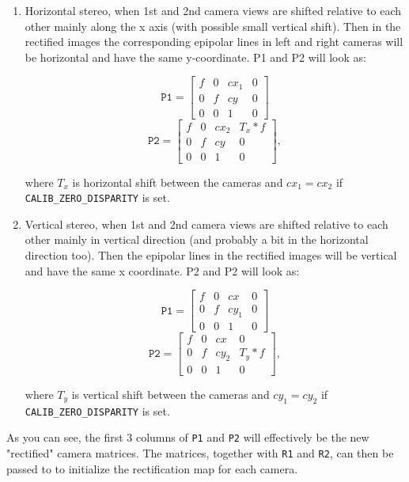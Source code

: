 \begin{enumerate}
\item Horizontal stereo, when 1st and 2nd camera views are shifted relative to each other mainly along the x axis (with possible small vertical shift). Then in the rectified images the corresponding epipolar lines in left and right cameras will be horizontal and have the same y-coordinate. P1 and P2 will look as: 

\[\texttt{P1}=
\begin{bmatrix}
f & 0 & cx_1 & 0\\
0 & f & cy & 0\\
0 & 0 & 1 & 0
\end{bmatrix}
\]
\[\texttt{P2}=
\begin{bmatrix}
f & 0 & cx_2 & T_x*f\\
0 & f & cy & 0\\
0 & 0 & 1 & 0
\end{bmatrix}
,
\]

where $T_x$ is horizontal shift between the cameras and $cx_1=cx_2$ if \texttt{CALIB\_ZERO\_DISPARITY} is set.
\item Vertical stereo, when 1st and 2nd camera views are shifted relative to each other mainly in vertical direction (and probably a bit in the horizontal direction too). Then the epipolar lines in the rectified images will be vertical and have the same x coordinate. P2 and P2 will look as:

\[
\texttt{P1}=
\begin{bmatrix}
f & 0 & cx & 0\\
0 & f & cy_1 & 0\\
0 & 0 & 1 & 0
\end{bmatrix}
\]
\[
\texttt{P2}=
\begin{bmatrix}
f & 0 & cx & 0\\
0 & f & cy_2 & T_y*f\\
0 & 0 & 1 & 0
\end{bmatrix}
,
\]

where $T_y$ is vertical shift between the cameras and $cy_1=cy_2$ if \texttt{CALIB\_ZERO\_DISPARITY} is set.
\end{enumerate} 

As you can see, the first 3 columns of \texttt{P1} and \texttt{P2} will effectively be the new "rectified" camera matrices. 
The matrices, together with \texttt{R1} and \texttt{R2}, can then be passed to  to initialize the rectification map for each camera.  

